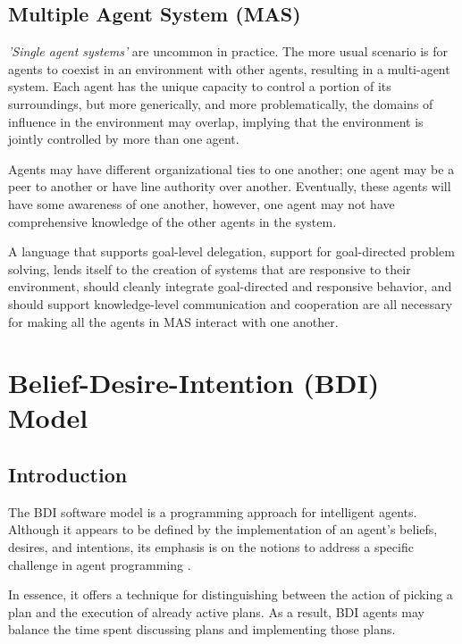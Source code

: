 \subsection{Multiple Agent System (MAS)}
\textit{'Single agent systems'} are uncommon in practice. The more usual scenario is for agents to coexist in an environment with other agents, resulting in a multi-agent system.
Each agent has the unique capacity to control a portion of its surroundings, but more generically, and more problematically, the domains of influence in the environment may overlap, implying that the environment is jointly controlled by more than one agent.

\vspace{.5cm}

Agents may have different organizational ties to one another; one agent may be a peer to another or have line authority over another. Eventually, these agents will have some awareness of one another, however, one agent may not have comprehensive knowledge of the other agents in the system.

\vspace{.5cm}

A language that supports goal-level delegation, support for goal-directed problem solving, lends itself to the creation of systems that are responsive to their environment, should cleanly integrate goal-directed and responsive behavior, and should support knowledge-level communication and cooperation are all necessary for making all the agents in MAS interact with one another.

\section{Belief-Desire-Intention (BDI) Model}

\subsection{Introduction}

The \ac{BDI} software model is a programming approach for intelligent agents. Although it appears to be defined by the implementation of an agent's beliefs, desires, and intentions, its emphasis is on the notions to address a specific challenge in agent programming \cite{ap}. 

\vspace{.5cm}

In essence, it offers a technique for distinguishing between the action of picking a plan and the execution of already active plans. As a result, \ac{BDI} agents may balance the time spent discussing plans and implementing those plans.

